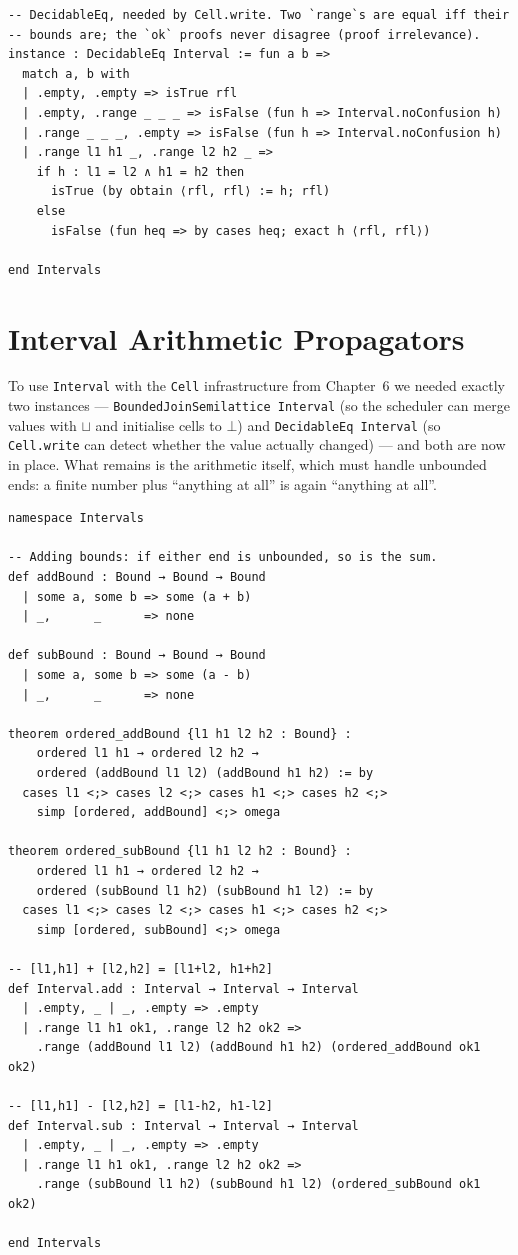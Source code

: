 \documentclass[12pt, a4paper, openright]{book}
\theoremstyle{thmstyle}
\theoremstyle{defstyle}
\newcommand{\lc}[1]{\texttt{#1}}
\begin{document}
\begin{verbatim}
-- DecidableEq, needed by Cell.write. Two `range`s are equal iff their
-- bounds are; the `ok` proofs never disagree (proof irrelevance).
instance : DecidableEq Interval := fun a b =>
  match a, b with
  | .empty, .empty => isTrue rfl
  | .empty, .range _ _ _ => isFalse (fun h => Interval.noConfusion h)
  | .range _ _ _, .empty => isFalse (fun h => Interval.noConfusion h)
  | .range l1 h1 _, .range l2 h2 _ =>
    if h : l1 = l2 ∧ h1 = h2 then
      isTrue (by obtain ⟨rfl, rfl⟩ := h; rfl)
    else
      isFalse (fun heq => by cases heq; exact h ⟨rfl, rfl⟩)

end Intervals
\end{verbatim}

\section{Interval Arithmetic Propagators}

To use \lc{Interval} with the \lc{Cell} infrastructure from Chapter~6 we
needed exactly two instances --- \lc{BoundedJoinSemilattice Interval} (so
the scheduler can merge values with $\sqcup$ and initialise cells to
$\bot$) and \lc{DecidableEq Interval} (so \lc{Cell.write} can detect
whether the value actually changed) --- and both are now in place. What
remains is the arithmetic itself, which must handle unbounded ends: a
finite number plus ``anything at all'' is again ``anything at all''.

\begin{verbatim}
namespace Intervals

-- Adding bounds: if either end is unbounded, so is the sum.
def addBound : Bound → Bound → Bound
  | some a, some b => some (a + b)
  | _,      _      => none

def subBound : Bound → Bound → Bound
  | some a, some b => some (a - b)
  | _,      _      => none

theorem ordered_addBound {l1 h1 l2 h2 : Bound} :
    ordered l1 h1 → ordered l2 h2 →
    ordered (addBound l1 l2) (addBound h1 h2) := by
  cases l1 <;> cases l2 <;> cases h1 <;> cases h2 <;>
    simp [ordered, addBound] <;> omega

theorem ordered_subBound {l1 h1 l2 h2 : Bound} :
    ordered l1 h1 → ordered l2 h2 →
    ordered (subBound l1 h2) (subBound h1 l2) := by
  cases l1 <;> cases l2 <;> cases h1 <;> cases h2 <;>
    simp [ordered, subBound] <;> omega

-- [l1,h1] + [l2,h2] = [l1+l2, h1+h2]
def Interval.add : Interval → Interval → Interval
  | .empty, _ | _, .empty => .empty
  | .range l1 h1 ok1, .range l2 h2 ok2 =>
    .range (addBound l1 l2) (addBound h1 h2) (ordered_addBound ok1 ok2)

-- [l1,h1] - [l2,h2] = [l1-h2, h1-l2]
def Interval.sub : Interval → Interval → Interval
  | .empty, _ | _, .empty => .empty
  | .range l1 h1 ok1, .range l2 h2 ok2 =>
    .range (subBound l1 h2) (subBound h1 l2) (ordered_subBound ok1 ok2)

end Intervals
\end{verbatim}
\end{document}
